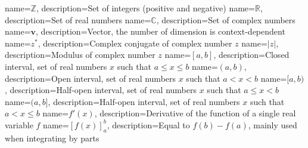 {
  name={$\mathbb{Z}$},
  description={Set of integers (positive and negative)}
}
{
  name={$\mathbb{R}$},
  description={Set of real numbers}
}
{
  name={$\mathbb{C}$},
  description={Set of complex numbers}
}
{
  name={$\mathbf{v}$},
  description={Vector, the number of dimension is context-dependent}
}
{
  name={$z^*$},
  description={Complex conjugate of complex number $z$}
}
{
  name={$|z|$},
  description={Modulus of complex number $z$}
}
{
  name={$[a,b]$},
  description={Closed interval, \ie set of real numbers $x$ such that $a\leq x \leq b$}
}
{
  name={$(a,b)$},
  description={Open interval, \ie set of real numbers $x$ such that $a< x <b$}
}
{
  name={$[a,b)$},
  description={Half-open interval, \ie set of real numbers $x$ such that $a\leq x <b$}
}
{
  name={$(a,b]$},
  description={Half-open interval, \ie set of real numbers $x$ such that $a< x\leq b$}
}
{
  name={$f'(x)$},
  description={Derivative of the function of a single real variable $f$}
}
{
  name={$\left[f(x)\right]_a^b$},
  description={Equal to $f(b)-f(a)$, mainly used when integrating by parts}
}
\makeglossaries

